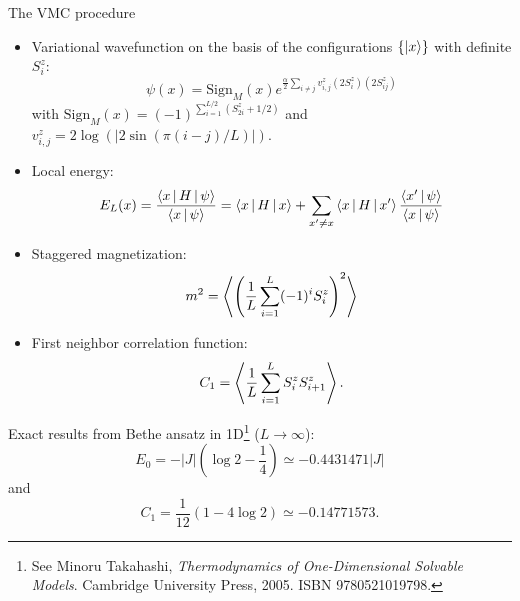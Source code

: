 \documentclass[10pt, compress, protectframetitle, handout]{beamer}
\begin{document}
\begin{frame}[allowframebreaks]{The VMC procedure}

	\begin{itemize}
		\item Variational wavefunction on the basis of the configurations $\{\Ket{x}\}$ with definite $S_{i}^{z}$:
		\begin{equation}
			\psi(x) = \text{Sign}_{M}(x)e^{\frac{\alpha}{2}\sum_{i \neq j}v_{i,j}^{z}(2S_{i}^{z})(2S_{ij}^{z})}
		\end{equation}
		with $\text{Sign}_{M}(x) = (-1)^{\sum_{i=1}^{L/2}(S_{2i}^{z}+1/2)}$ and $v_{i,j}^{z} = 2\log(|2\sin(\pi(i-j)/L)|)$.
		\item Local energy:
		\begin{equation}
			E_L(x) = \frac{\Braket{x|H|\psi}}{\Braket{x|\psi}} 
			= \Braket{x|H|x} 
			+ \sum_{x' \neq x} \Braket{x|H|x'}\frac{\Braket{x'|\psi}}{\Braket{x|\psi}} 
		\end{equation}
		\item Staggered magnetization:
		\begin{equation}
			m^2 = \Braket{ \left( \frac{1}{L}\sum_{i=1}^{L}(-1)^iS_{i}^{z} \right)^2 }
		\end{equation}
		\item First neighbor correlation function:
		\begin{equation}
			C_1 = \Braket{\frac{1}{L}\sum_{i=1}^{L}S_{i}^{z}S_{i+1}^{z}}.
		\end{equation}
	\end{itemize}
	
	Exact results from Bethe ansatz in 1D\footnote{See Minoru Takahashi, \emph{Thermodynamics of One-Dimensional Solvable Models}. Cambridge University Press, 2005. ISBN 9780521019798.} ($L \to \infty$):
	\begin{equation*}
		E_{0} = -|J|\left(\log2-\frac{1}{4}\right) \simeq -0.4431471|J|
	\end{equation*}
	and
	\begin{equation*}
		C_1 = \frac{1}{12}\left(1-4\log2\right) \simeq -0.14771573.
	\end{equation*}
	
\end{frame}
\end{document}
